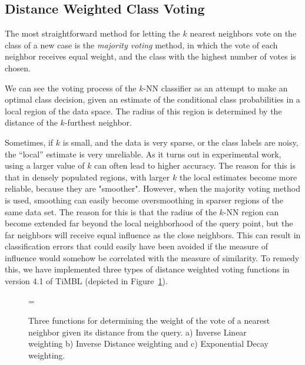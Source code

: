 \documentclass{report}
\begin{document}
\subsection{Distance Weighted Class Voting}
\label{distweightvote}

The most straightforward method for letting the $k$ nearest neighbors
vote on the class of a new case is the {\em majority voting} method,
in which the vote of each neighbor receives equal weight, and the
class with the highest number of votes is chosen. 

We can see the voting process of the $k$-NN classifier as an attempt
to make an optimal class decision, given an estimate of the
conditional class probabilities in a local region of the data space.
The radius of this region is determined by the distance of the
$k$-furthest neighbor.

Sometimes, if $k$ is small, and the data is very sparse, or the class
labels are noisy, the ``local'' estimate is very unreliable.  As it
turns out in experimental work, using a larger value of $k$ can often
lead to higher accuracy. The reason for this is that in densely
populated regions, with larger $k$ the local estimates become more
reliable, because they are "smoother".  However, when the majority
voting method is used, smoothing can easily become oversmoothing in
sparser regions of the same data set. The reason for this is that the
radius of the $k$-NN region can become extended far beyond the local
neighborhood of the query point, but the far neighbors will receive
equal influence as the close neighbors. This can result in
classification errors that could easily have been avoided if the
measure of influence would somehow be correlated with the measure of
similarity. To remedy this, we have implemented three types of distance 
weighted voting functions in version 4.1 of TiMBL (depicted in 
Figure~\ref{dist-weight-fig}).

\begin{figure}[htb]
        \begin{center}
                \leavevmode
                \epsfxsize=\columnwidth
                \caption{Three functions for determining the weight of the vote
of a nearest neighbor given its distance
from the query. a) Inverse Linear weighting b) Inverse Distance weighting and
c) Exponential Decay weighting.
                }
                \label{dist-weight-fig}
        \end{center}
\end{figure}
\end{document}
